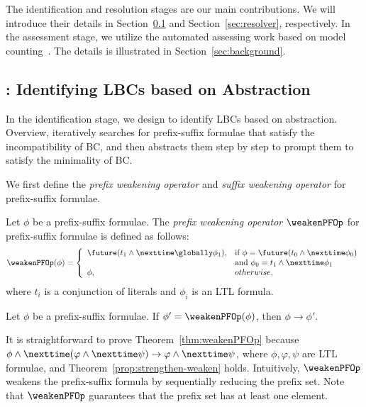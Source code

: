 The identification and resolution stages are our main contributions.
We will introduce their details in Section~\ref{sec:identifier} and Section~\ref{sec:resolver}, respectively.
In the assessment stage, we utilize the automated assessing work based on model counting~\cite{degiovanni2018goal}.
The details is illustrated in Section~\ref{sec:background}.

\subsection{\identifier: Identifying LBCs based on Abstraction}\label{sec:identifier}

In the identification stage, we design \identifier to identify LBCs based on abstraction.
Overview, \identifier iteratively searches for prefix-suffix formulae that satisfy the incompatibility of BC, and then abstracts them step by step to prompt them to satisfy the minimality of BC.

We first define the {\em prefix weakening operator} and {\em suffix weakening operator} for prefix-suffix formulae. 

\begin{definition}\label{def:weakenPFOp}
    Let $\phi$ be a prefix-suffix formulae. 
    The {\em prefix weakening operator} $\weakenPFOp$ for prefix-suffix formulae is defined as follows:
    \begin{equation}
        \nonumber
        \weakenPFOp(\phi) =
        \left\{
            \begin{array}{ll}
            \future(t_1 \land \nexttime \globally \phi_1), & \text{if } \phi = \future(t_0 \land \nexttime \phi_0)\\
            &\text{and } \phi_0 = t_1 \land \nexttime \phi_1\\
            \phi, & otherwise,\\
            \end{array}
        \right.
    \end{equation}
    where $t_i$ is a conjunction of literals and $\phi_i$ is an LTL formula.
\end{definition}

\begin{theorem}\label{thm:weakenPFOp}
    Let $\phi$ be a prefix-suffix formulae. 
    If $\phi' = \weakenPFOp(\phi)$, then $\phi \to \phi'$.
\end{theorem}

It is straightforward to prove Theorem~\ref{thm:weakenPFOp} because $\phi \land \nexttime (\varphi \land \nexttime \psi) \to \varphi \land \nexttime \psi$, where $\phi,\varphi,\psi$ are LTL formulae, and Theorem~\ref{prop:strengthen-weaken} holds.
Intuitively, $\weakenPFOp$ weakens the prefix-suffix formula by sequentially reducing the prefix set.
Note that $\weakenPFOp$ guarantees that the prefix set has at least one element.

